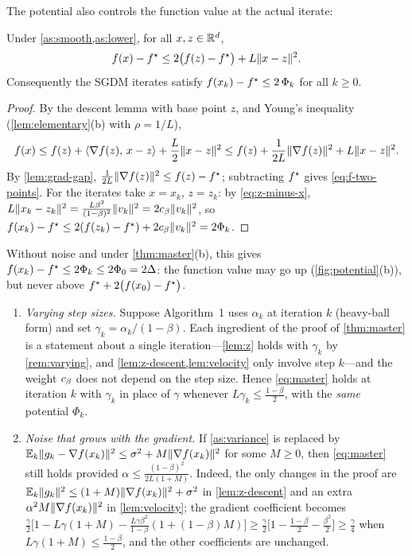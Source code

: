 The potential also controls the function value at the actual iterate:

\begin{lemma}\label{lem:phi-controls-f}
Under \cref{as:smooth,as:lower}, for all $x,z\in\mathbb{R}^d$,
\begin{equation}\label{eq:f-two-points}
  f(x)-f^\star\le2\bigl(f(z)-f^\star\bigr)+L\lVert x-z\rVert^2 .
\end{equation}
Consequently the SGDM iterates satisfy $f(x_k)-f^\star\le2\,\Phi_k$ for all $k\ge0$.
\end{lemma}

\begin{proof}
By the descent lemma with base point $z$, and Young's inequality
(\cref{lem:elementary}(b) with $\rho=1/L$),
\[
  f(x)\le f(z)+\langle \nabla f(z),\, x-z\rangle+\frac L2\lVert x-z\rVert^2
  \le f(z)+\frac{1}{2L}\lVert \nabla f(z)\rVert^2+L\lVert x-z\rVert^2 .
\]
By \cref{lem:grad-gap}, $\frac1{2L}\lVert \nabla f(z)\rVert^2\le f(z)-f^\star$; subtracting $f^\star$
gives \eqref{eq:f-two-points}. For the iterates take $x=x_k$, $z=z_k$: by
\eqref{eq:z-minus-x}, $L\lVert x_k-z_k\rVert^2=\frac{L\beta^2}{(1-\beta)^2}\lVert v_k\rVert^2=2c_\beta\lVert v_k\rVert^2$,
so $f(x_k)-f^\star\le2(f(z_k)-f^\star)+2c_\beta\lVert v_k\rVert^2=2\Phi_k$.
\end{proof}

Without noise and under \cref{thm:master}(b), this gives $f(x_k)-f^\star\le2\Phi_k\le2\Phi_0=2\Delta$:
the function value may go up (\cref{fig:potential}(b)), but never above
$f^\star+2\bigl(f(x_0)-f^\star\bigr)$.

\begin{remark}\label{rem:extensions}
\begin{enumerate}[label=\textup{(\roman*)},leftmargin=2em]
\item \emph{Varying step sizes.} Suppose Algorithm~1 uses $\alpha_k$ at iteration $k$
  (heavy-ball form) and set $\gamma_k=\alpha_k/(1-\beta)$. Each ingredient of the proof of
  \cref{thm:master} is a statement about a single iteration---\cref{lem:z} holds with
  $\gamma_k$ by \cref{rem:varying}, and \cref{lem:z-descent,lem:velocity} only involve
  step $k$---and the weight $c_\beta$ does not depend on the step size. Hence
  \eqref{eq:master} holds at iteration $k$ with $\gamma_k$ in place of $\gamma$ whenever
  $L\gamma_k\le\frac{1-\beta}{2}$, with the \emph{same} potential $\Phi_k$.
\item \emph{Noise that grows with the gradient.} If \cref{as:variance} is replaced by
  $\mathbb{E}_k\lVert g_k-\nabla f(x_k)\rVert^2\le\sigma^2+M\lVert \nabla f(x_k)\rVert^2$ for some $M\ge0$, then
  \eqref{eq:master} still holds provided $\alpha\le\frac{(1-\beta)^2}{2L(1+M)}$. Indeed,
  the only changes in the proof are $\mathbb{E}_k\lVert g_k\rVert^2\le(1+M)\lVert \nabla f(x_k)\rVert^2+\sigma^2$
  in \cref{lem:z-descent} and an extra $\alpha^2M\lVert \nabla f(x_k)\rVert^2$ in
  \cref{lem:velocity}; the gradient coefficient becomes
  $\frac\gamma2\bigl[1-L\gamma(1+M)-\frac{L\gamma\beta^2}{1-\beta}(1+(1-\beta)M)\bigr]
  \ge\frac\gamma2\bigl[1-\frac{1-\beta}{2}-\frac{\beta^2}{2}\bigr]\ge\frac\gamma4$ when
  $L\gamma(1+M)\le\frac{1-\beta}{2}$, and the other coefficients are unchanged.
\end{enumerate}
\end{remark}
